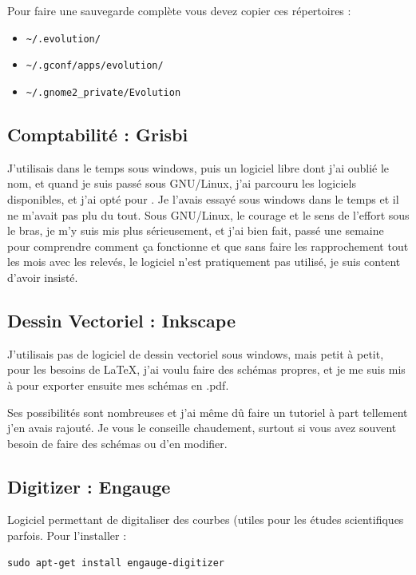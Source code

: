 \documentclass[a4paper,twoside]{article}
\begin{document}
\begin{remarque}
Pour faire une sauvegarde complète vous devez copier ces répertoires :
\begin{itemize}
\item  \verb|~/.evolution/|
\item  \verb|~/.gconf/apps/evolution/|
\item  \verb|~/.gnome2_private/Evolution|
\end{itemize}
\end{remarque}


\subsection{Comptabilité : Grisbi}
J'utilisais  dans le temps sous windows, puis un logiciel libre dont j'ai oublié le nom, et quand je suis passé sous GNU/Linux, j'ai parcouru les logiciels disponibles, et j'ai opté pour . Je l'avais essayé sous windows dans le temps et il ne m'avait pas plu du tout. Sous GNU/Linux, le courage et le sens de l'effort sous le bras, je m'y suis mis plus sérieusement, et j'ai bien fait, passé une semaine pour comprendre comment ça fonctionne et que sans faire les rapprochement tout les mois avec les relevés, le logiciel n'est pratiquement pas utilisé, je suis content d'avoir insisté.

\subsection{Dessin Vectoriel : Inkscape}
J'utilisais pas de logiciel de dessin vectoriel sous windows, mais petit à petit, pour les besoins de \LaTeX, j'ai voulu faire des schémas propres, et je me suis mis à  pour exporter ensuite mes schémas en .pdf. 

Ses possibilités sont nombreuses et j'ai même dû faire un tutoriel à part tellement j'en avais rajouté. Je vous le conseille chaudement, surtout si vous avez souvent besoin de faire des schémas ou d'en modifier.



\subsection{Digitizer : Engauge}
Logiciel permettant de digitaliser des courbes (utiles pour les études scientifiques parfois. Pour l'installer :
\begin{verbatim}
sudo apt-get install engauge-digitizer
\end{verbatim}
\end{document}
